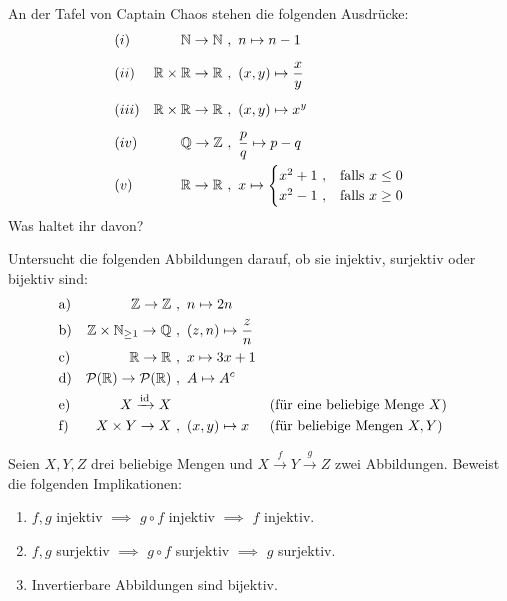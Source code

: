 \begin{aufg}[Wohldefiniertheit] \label{aufg:wohldef}
    An der Tafel von Captain Chaos stehen die folgenden Ausdrücke:
    \begin{align*}
        & (i) & \mathbb N \to \mathbb N\ &,\ n \mapsto n-1 \\[0.5em]
        & (ii) & \mathbb R\times \mathbb R \to \mathbb R \ &,\ (x,y) \mapsto \frac{x}{y} \\[0.5em]
        & (iii) & \mathbb R \times \mathbb R \to \mathbb R \ &,\ (x,y) \mapsto x^y \\[0.5em]
        & (iv) & \mathbb Q \to \mathbb Z \ &,\ \frac{p}{q} \mapsto p-q \\
        & (v) & \mathbb R \to \mathbb R \ &,\ x \mapsto \begin{cases}
            x^2+1\ , & \text{falls}\ x \le 0 \\
            x^2-1\ , & \text{falls}\ x\ge 0
        \end{cases}
    \end{align*}
    Was haltet ihr davon?
\end{aufg}


\begin{aufg}
    Untersucht die folgenden Abbildungen darauf, ob sie injektiv, surjektiv oder bijektiv sind:
    \begin{align*}
        & \text{a)} & \mathbb Z \to \mathbb Z\ &,\ n\mapsto 2n \\
        & \text{b)} & \mathbb Z \times \mathbb N_{\ge 1} \to \mathbb Q\ &,\ (z,n) \mapsto \frac{z}{n} \\
        & \text{c)} & \mathbb R \to \mathbb R\ &,\ x\mapsto 3x+1 \\
        & \text{d)} & \mathcal P(\mathbb R) \to \mathcal P(\mathbb R) \ &,\ A \mapsto A^c \\
        & \text{e)} & X\xrightarrow{\mathrm{id}} X\ & && (\text{für eine beliebige Menge $X$}) \\
        & \text{f)} & X\times Y \to X \ &,\ (x,y) \mapsto x && (\text{für beliebige Mengen $X,Y$})
    \end{align*}
\end{aufg}


\begin{aufg} \label{aufg:bijektiviso}
    Seien $X,Y,Z$ drei beliebige Mengen und $X \xrightarrow{f} Y \xrightarrow{g} Z$ zwei Abbildungen. Beweist die folgenden Implikationen:
    \begin{enumerate}
        \item $f,g$ injektiv $\implies$ $g\circ f$ injektiv $\implies$ $f$ injektiv.
        \item $f,g$ surjektiv $\implies$ $g\circ f$ surjektiv $\implies$ $g$ surjektiv.
        \item Invertierbare Abbildungen sind bijektiv.
    \end{enumerate}
\end{aufg}

